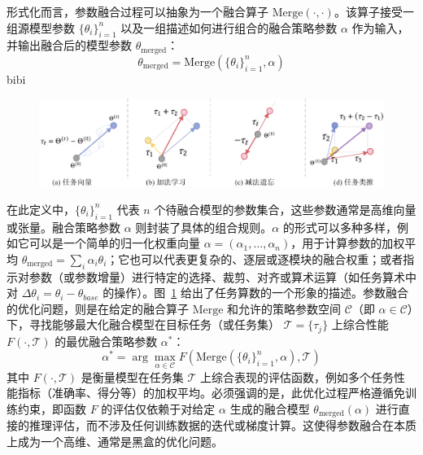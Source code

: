 \documentclass[../main.tex]{subfiles}
\begin{document}
形式化而言，参数融合过程可以抽象为一个融合算子 $\text{Merge}(\cdot, \cdot)$。该算子接受一组源模型参数 $\{\theta_i\}_{i=1}^n$ 以及一组描述如何进行组合的融合策略参数 $\alpha$ 作为输入，并输出融合后的模型参数 $\theta_\mathrm{merged}$：
\begin{equation}
	\theta_\mathrm{merged} = \text{Merge}(\{\theta_i\}_{i=1}^n, \alpha) \label{eq:merge_operator}
\end{equation}
bibi
\begin{figure}
	\centering
	\includegraphics[width=\textwidth]{task-arithmetic-crop.pdf}
	\label{fig:model-parameter-fusion}
\end{figure}
在此定义中，$\{\theta_i\}_{i=1}^n$ 代表 $n$ 个待融合模型的参数集合，这些参数通常是高维向量或张量。融合策略参数 $\alpha$ 则封装了具体的组合规则。$\alpha$ 的形式可以多种多样，例如它可以是一个简单的归一化权重向量 $\alpha = (\alpha_1, \dots, \alpha_n)$，用于计算参数的加权平均 $\theta_\mathrm{merged} = \sum_i \alpha_i \theta_i$；它也可以代表更复杂的、逐层或逐模块的融合权重；或者指示对参数（或参数增量）进行特定的选择、裁剪、对齐或算术运算（如任务算术中对 $\Delta \theta_i = \theta_i - \theta_{base}$ 的操作）。图~\ref{fig:model-parameter-fusion} 给出了任务算数的一个形象的描述。参数融合的优化问题，则是在给定的融合算子 $\text{Merge}$ 和允许的策略参数空间 $\mathcal{C}$（即 $\alpha \in \mathcal{C}$）下，寻找能够最大化融合模型在目标任务（或任务集） $\mathcal{T} = \{\tau_j\}$ 上综合性能 $F(\cdot, \mathcal{T})$ 的最优融合策略参数 $\alpha^*$：
\begin{equation}
	\alpha^* = \arg\max_{\alpha \in \mathcal{C}} F(\text{Merge}(\{\theta_i\}_{i=1}^n, \alpha), \mathcal{T}) \label{eq:merge_objective}
\end{equation}
其中 $F(\cdot, \mathcal{T})$ 是衡量模型在任务集 $\mathcal{T}$ 上综合表现的评估函数，例如多个任务性能指标（准确率、得分等）的加权平均。必须强调的是，此优化过程严格遵循免训练约束，即函数 $F$ 的评估仅依赖于对给定 $\alpha$ 生成的融合模型 $\theta_\mathrm{merged}(\alpha)$ 进行直接的推理评估，而不涉及任何训练数据的迭代或梯度计算。这使得参数融合在本质上成为一个高维、通常是黑盒的优化问题。
\end{document}
